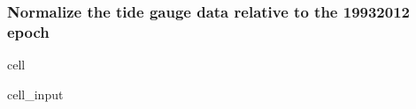 \documentclass[letterpaper,10pt,english]{jupyterBook}
\begin{document}
\subsubsection{Normalize the tide gauge data relative to the 1993\sphinxhyphen{}2012 epoch}
\label{\detokenize{notebooks/SL_Data_Wrangling:normalize-the-tide-gauge-data-relative-to-the-1993-2012-epoch}}
\begin{sphinxuseclass}{cell}\begin{sphinxVerbatimInput}

\begin{sphinxuseclass}{cell_input}
\begin{sphinxVerbatim}[commandchars=\\\{\}]
    
   
  
\end{sphinxVerbatim}

\end{sphinxuseclass}\end{sphinxVerbatimInput}

\end{sphinxuseclass}
\end{document}

